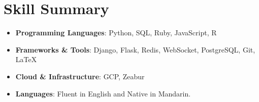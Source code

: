 \documentclass[letterpaper,11pt]{article}
\makeatletter
\newcommand{\resumeSubheading}[4]{
  \vspace{-1pt}\item
    \begin{tabular*}{0.97\textwidth}{l@{\extracolsep{\fill}}r}
      \textbf{#1} & #2 \\
      \textit{\small#3} & \textit{\small #4} \\
    \end{tabular*}\vspace{-5pt}
}
\newcommand{\resumeSubHeadingListStart}{\begin{itemize}[leftmargin=*]}
\newcommand{\resumeSubHeadingListEnd}{\end{itemize}}
\makeatother
\begin{document}
%
\section{Skill Summary}
 \resumeSubHeadingListStart
   \item{
     \textbf{Programming Languages}{: Python, SQL, Ruby, JavaScript, R}
   }
   \item{
     \textbf{Frameworks \& Tools}{: Django, Flask, Redis, WebSocket, PostgreSQL, Git, LaTeX}
   }
   \item{
     \textbf{Cloud \& Infrastructure}{: GCP, Zeabur}
   }
   \item{
     \textbf{Languages}{: Fluent in English and Native in Mandarin.}
   }
 \resumeSubHeadingListEnd



\end{document}
